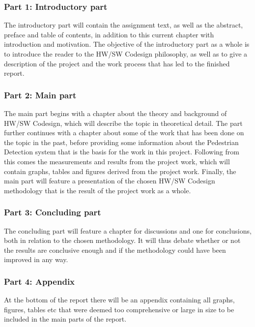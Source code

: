 \subsubsection{Part 1: Introductory part}
The introductory part will contain the assignment text, as well as the abstract, preface and table of contents, in addition to this current chapter with introduction and motivation. The objective of the introductory part as a whole is to introduce the reader to the HW/SW Codesign philosophy, as well as to give a description of the project and the work process that has led to the finished report. 
\\
\noindent
\subsubsection{Part 2: Main part}
The main part begins with a chapter about the theory and background of HW/SW Codesign, which will describe the topic in theoretical detail. The part further continues with a chapter about some of the work that has been done on the topic in the past, before providing some information about the Pedestrian Detection system that is the basis for the work in this project. Following from this comes the measurements and results from the project work, which will contain graphs, tables and figures derived from the project work. 
Finally, the main part will feature a presentation of the chosen HW/SW Codesign methodology that is the result of the project work as a whole. 
\\
\noindent
\subsubsection{Part 3: Concluding part}
The concluding part will feature a chapter for discussions and one for conclusions, both in relation to the chosen methodology. It will thus debate whether or not the results are conclusive enough and if the methodology could have been improved in any way. 
\\
\noindent
\subsubsection{Part 4: Appendix}
At the bottom of the report there will be an appendix containing all graphs, figures, tables etc that were deemed too comprehensive or large in size to be included in the main parts of the report. 


\clearpage


